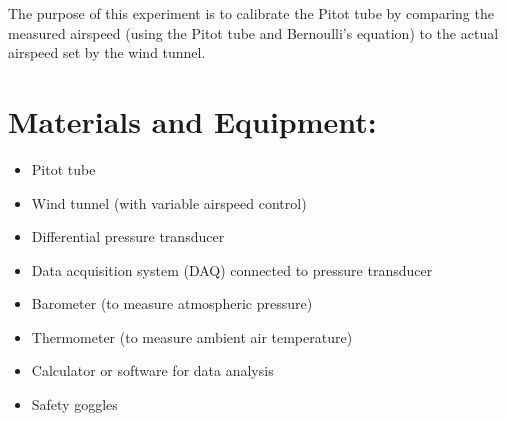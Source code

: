 \documentclass[12pt]{article}
\begin{document}
The purpose of this experiment is to calibrate the Pitot tube by comparing the measured airspeed (using the Pitot tube and Bernoulli’s equation) to the actual airspeed set by the wind tunnel.
\clearpage

\section{Materials and Equipment:} 
\begin{itemize}
\item Pitot tube
\item Wind tunnel (with variable airspeed control)
\item Differential pressure transducer
\item Data acquisition system (DAQ) connected to pressure transducer
\item Barometer (to measure atmospheric pressure)
\item Thermometer (to measure ambient air temperature)
\item Calculator or software for data analysis
\item Safety goggles
\end{itemize}
\clearpage
\end{document}
